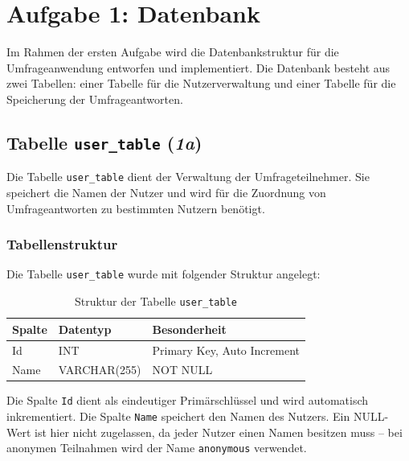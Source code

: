 
\chapter{Aufgabe 1: Datenbank}
\label{chap:aufgabe1}
\thispagestyle{fancy}

Im Rahmen der ersten Aufgabe wird die Datenbankstruktur für die Umfrageanwendung entworfen und implementiert. Die Datenbank besteht aus zwei Tabellen: einer Tabelle für die Nutzerverwaltung und einer Tabelle für die Speicherung der Umfrageantworten.


\section{Tabelle \texttt{user\_table} (\textit{1a})}

Die Tabelle \texttt{user\_table} dient der Verwaltung der Umfrageteilnehmer. Sie speichert die Namen der Nutzer und wird für die Zuordnung von Umfrageantworten zu bestimmten Nutzern benötigt.

\subsection{Tabellenstruktur}

Die Tabelle \texttt{user\_table} wurde mit folgender Struktur angelegt:

\begin{table}[h]
\centering
\begin{tabular}{|l|l|l|}
\hline
\textbf{Spalte} & \textbf{Datentyp} & \textbf{Besonderheit} \\
\hline
Id & INT & Primary Key, Auto Increment \\
Name & VARCHAR(255) & NOT NULL \\
\hline
\end{tabular}
\caption{Struktur der Tabelle \texttt{user\_table}}
\label{tab:user_table}
\end{table}

Die Spalte \texttt{Id} dient als eindeutiger Primärschlüssel und wird automatisch inkrementiert. Die Spalte \texttt{Name} speichert den Namen des Nutzers. Ein NULL-Wert ist hier nicht zugelassen, da jeder Nutzer einen Namen besitzen muss – bei anonymen Teilnahmen wird der Name \texttt{anonymous} verwendet.


